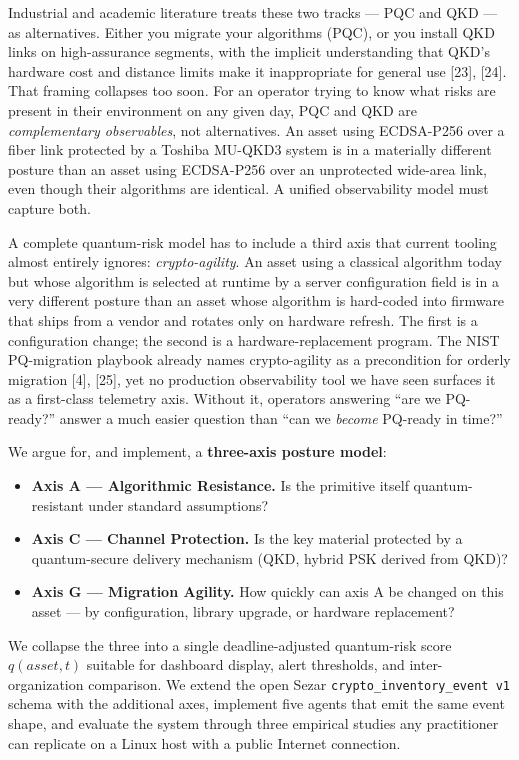 Industrial and academic literature treats these two tracks --- PQC and
QKD --- as alternatives. Either you migrate your algorithms (PQC), or
you install QKD links on high-assurance segments, with the implicit
understanding that QKD's hardware cost and distance limits make it
inappropriate for general use {[}23{]}, {[}24{]}. That framing collapses
too soon. For an operator trying to know what risks are present in their
environment on any given day, PQC and QKD are \emph{complementary
observables}, not alternatives. An asset using ECDSA-P256 over a fiber
link protected by a Toshiba MU-QKD3 system is in a materially different
posture than an asset using ECDSA-P256 over an unprotected wide-area
link, even though their algorithms are identical. A unified
observability model must capture both.

A complete quantum-risk model has to include a third axis that current
tooling almost entirely ignores: \emph{crypto-agility}. An asset using a
classical algorithm today but whose algorithm is selected at runtime by
a server configuration field is in a very different posture than an
asset whose algorithm is hard-coded into firmware that ships from a
vendor and rotates only on hardware refresh. The first is a
configuration change; the second is a hardware-replacement program. The
NIST PQ-migration playbook already names crypto-agility as a
precondition for orderly migration {[}4{]}, {[}25{]}, yet no production
observability tool we have seen surfaces it as a first-class telemetry
axis. Without it, operators answering ``are we PQ-ready?'' answer a much
easier question than ``can we \emph{become} PQ-ready in time?''

We argue for, and implement, a \textbf{three-axis posture model}:

\begin{itemize}
\tightlist
\item
  \textbf{Axis A --- Algorithmic Resistance.} Is the primitive itself
  quantum-resistant under standard assumptions?
\item
  \textbf{Axis C --- Channel Protection.} Is the key material protected
  by a quantum-secure delivery mechanism (QKD, hybrid PSK derived from
  QKD)?
\item
  \textbf{Axis G --- Migration Agility.} How quickly can axis A be
  changed on this asset --- by configuration, library upgrade, or
  hardware replacement?
\end{itemize}

We collapse the three into a single deadline-adjusted quantum-risk score
\(q(\mathit{asset}, t)\) suitable for dashboard display, alert
thresholds, and inter-organization comparison. We extend the open Sezar
\texttt{crypto\_inventory\_event\ v1} schema with the additional axes,
implement five agents that emit the same event shape, and evaluate the
system through three empirical studies any practitioner can replicate on
a Linux host with a public Internet connection.

